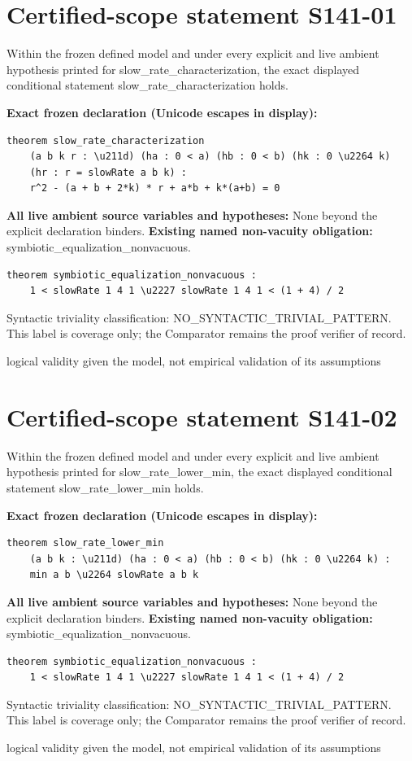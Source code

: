 \documentclass[11pt]{article}
\begin{document}
\section*{Certified-scope statement S141-01}
Within the frozen defined model and under every explicit and live ambient hypothesis printed for slow\_rate\_characterization, the exact displayed conditional statement slow\_rate\_characterization holds.
\par\noindent\textbf{Exact frozen declaration (Unicode escapes in display):}
\begin{verbatim}
theorem slow_rate_characterization
    (a b k r : \u211d) (ha : 0 < a) (hb : 0 < b) (hk : 0 \u2264 k)
    (hr : r = slowRate a b k) :
    r^2 - (a + b + 2*k) * r + a*b + k*(a+b) = 0
\end{verbatim}
\noindent\textbf{All live ambient source variables and hypotheses:}
None beyond the explicit declaration binders.
\noindent\textbf{Existing named non-vacuity obligation:} symbiotic\_equalization\_nonvacuous.
\begin{verbatim}
theorem symbiotic_equalization_nonvacuous :
    1 < slowRate 1 4 1 \u2227 slowRate 1 4 1 < (1 + 4) / 2
\end{verbatim}
\noindent Syntactic triviality classification: NO\_SYNTACTIC\_TRIVIAL\_PATTERN. This label is coverage only; the Comparator remains the proof verifier of record.
\par\noindent logical validity given the model, not empirical validation of its assumptions
\section*{Certified-scope statement S141-02}
Within the frozen defined model and under every explicit and live ambient hypothesis printed for slow\_rate\_lower\_min, the exact displayed conditional statement slow\_rate\_lower\_min holds.
\par\noindent\textbf{Exact frozen declaration (Unicode escapes in display):}
\begin{verbatim}
theorem slow_rate_lower_min
    (a b k : \u211d) (ha : 0 < a) (hb : 0 < b) (hk : 0 \u2264 k) :
    min a b \u2264 slowRate a b k
\end{verbatim}
\noindent\textbf{All live ambient source variables and hypotheses:}
None beyond the explicit declaration binders.
\noindent\textbf{Existing named non-vacuity obligation:} symbiotic\_equalization\_nonvacuous.
\begin{verbatim}
theorem symbiotic_equalization_nonvacuous :
    1 < slowRate 1 4 1 \u2227 slowRate 1 4 1 < (1 + 4) / 2
\end{verbatim}
\noindent Syntactic triviality classification: NO\_SYNTACTIC\_TRIVIAL\_PATTERN. This label is coverage only; the Comparator remains the proof verifier of record.
\par\noindent logical validity given the model, not empirical validation of its assumptions
\end{document}
